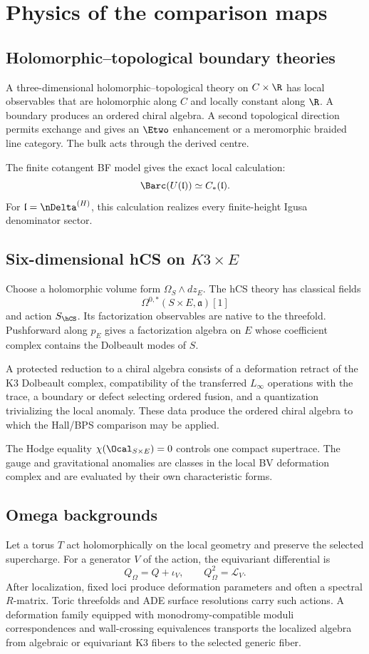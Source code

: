 \part[Physics]{Physics of the comparison maps}

\chapter{Holomorphic--topological boundary theories}
A three-dimensional holomorphic--topological theory on $C\times\R$ has local observables that are holomorphic along $C$ and locally constant along $\R$. A boundary produces an ordered chiral algebra. A second topological direction permits exchange and gives an $\Etwo$ enhancement or a meromorphic braided line category. The bulk acts through the derived centre.

The finite cotangent BF model gives the exact local calculation:
\[
 \Barc(U(\mathfrak l))\simeq C_*(\mathfrak l).
\]
For $\mathfrak l=\nDelta^{(H)}$, this calculation realizes every finite-height Igusa denominator sector.

\chapter{Six-dimensional hCS on \texorpdfstring{$K3\times E$}{K3 x E}}
Choose a holomorphic volume form $\Omega_S\wedge dz_E$. The hCS theory has classical fields
\[
 \Omega^{0,*}(S\times E,\mathfrak a)[1]
\]
and action $S_{\hCS}$. Its factorization observables are native to the threefold. Pushforward along $p_E$ gives a factorization algebra on $E$ whose coefficient complex contains the Dolbeault modes of $S$.

A protected reduction to a chiral algebra consists of a deformation retract of the K3 Dolbeault complex, compatibility of the transferred $L_\infty$ operations with the trace, a boundary or defect selecting ordered fusion, and a quantization trivializing the local anomaly. These data produce the ordered chiral algebra to which the Hall/BPS comparison may be applied.

The Hodge equality $\chi(\Ocal_{S\times E})=0$ controls one compact supertrace. The gauge and gravitational anomalies are classes in the local BV deformation complex and are evaluated by their own characteristic forms.

\chapter{Omega backgrounds}
Let a torus $T$ act holomorphically on the local geometry and preserve the selected supercharge. For a generator $V$ of the action, the equivariant differential is
\[
 Q_\Omega=Q+\iota_V,
 \qquad Q_\Omega^2=\mathcal L_V.
\]
After localization, fixed loci produce deformation parameters and often a spectral $R$-matrix. Toric threefolds and ADE surface resolutions carry such actions. A deformation family equipped with monodromy-compatible moduli correspondences and wall-crossing equivalences transports the localized algebra from algebraic or equivariant K3 fibers to the selected generic fiber.

